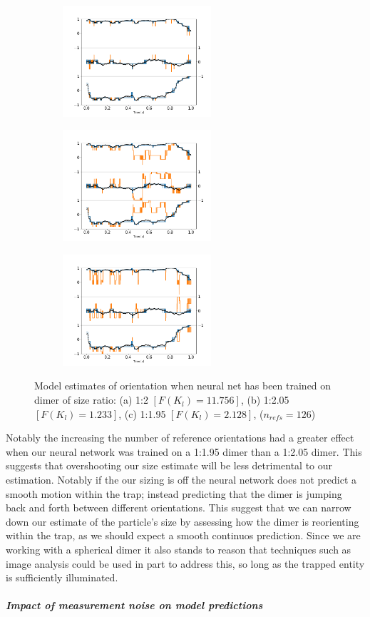 \documentclass[12pt]{spieman}
\begin{document}
\begin{spacing}{1.5}
\begin{figure}[h]
	\centering
	\begin{subfigure}{0.31\textwidth}
		\subcaption{}
		\includegraphics[width =5.5cm]{./Images/fig9a.png}
	\end{subfigure}
	\begin{subfigure}{0.31\textwidth}
		\subcaption{}
		\includegraphics[width=5.5cm]{./Images/fig9b.png}
	\end{subfigure}
	\begin{subfigure}{0.31\textwidth}
		\subcaption{}
		\includegraphics[width=5.5cm]{./Images/fig9c.png}
	\end{subfigure}
	\caption{Model estimates of orientation when neural net has been trained on dimer of size ratio: (a) 1:2 $[F(K_l)=11.756]$, (b) 1:2.05 $[F(K_l)=1.233]$, (c) 1:1.95 $[F(K_l)=2.128]$, ($n_{refs} = 126$)}
	\label{fig:refs}
\end{figure}

Notably the increasing the number of reference orientations had a greater effect when our neural network was trained on a 1:1.95 dimer than a 1:2.05 dimer. This suggests that overshooting our size estimate will be less detrimental to our estimation. Notably if the our sizing is off the neural network does not predict a smooth motion within the trap; instead predicting that the dimer is jumping back and forth between different orientations. This suggest that we can narrow down our estimate of the particle's size by assessing how the dimer is reorienting within the trap, as we should expect a smooth continuos prediction. Since we are working with a spherical dimer it also stands to reason that techniques such as image analysis could be used in part to address this, so long as the trapped entity is sufficiently illuminated. 
\subparagraph{Impact of measurement noise on model predictions}
\label{sec:epsilon}


\end{spacing}
\end{document}
